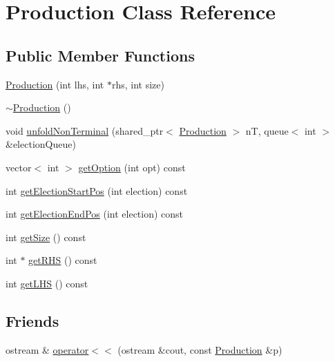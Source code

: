 \hypertarget{classProduction}{\section{Production Class Reference}
\label{classProduction}
}
\subsection*{Public Member Functions}
\begin{DoxyCompactItemize}
\item 
\hyperlink{classProduction_a92f0f1d1dbb5c68af2d6f8c89844d4ff}{Production} (int lhs, int $\ast$rhs, int size)
\item 
\hyperlink{classProduction_ab5b3060f9e0a2bc189844e426d693dab}{$\sim$\-Production} ()
\item 
void \hyperlink{classProduction_a4038d894f79a5a86c86a9c1d66040413}{unfold\-Non\-Terminal} (shared\-\_\-ptr$<$ \hyperlink{classProduction}{Production} $>$ n\-T, queue$<$ int $>$ \&election\-Queue)
\item 
vector$<$ int $>$ \hyperlink{classProduction_a5990c3ec3c934f4495bb6bb858584921}{get\-Option} (int opt) const 
\item 
int \hyperlink{classProduction_aab0440acaa257a40d134a2158d5df777}{get\-Election\-Start\-Pos} (int election) const 
\item 
int \hyperlink{classProduction_a93f8128c95b20f4f59cbc817efb9d301}{get\-Election\-End\-Pos} (int election) const 
\item 
int \hyperlink{classProduction_a93ac262e02b0ccbb1947a00ee4781cb6}{get\-Size} () const 
\item 
int $\ast$ \hyperlink{classProduction_a31a72db90489bc566a819ef360cf23f0}{get\-R\-H\-S} () const 
\item 
int \hyperlink{classProduction_ab2dbdb2d626870e8b8f8a655f0d2f17a}{get\-L\-H\-S} () const 
\end{DoxyCompactItemize}
\subsection*{Friends}
\begin{DoxyCompactItemize}
\item 
ostream \& \hyperlink{classProduction_ad80a14935ba04d26e9067e3c388002d7}{operator$<$$<$} (ostream \&cout, const \hyperlink{classProduction}{Production} \&p)
\end{DoxyCompactItemize}


